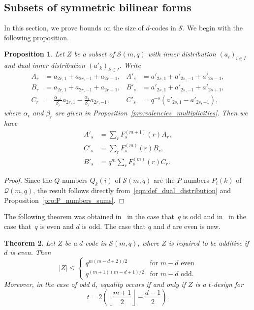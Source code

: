 \documentclass[10pt]{article}
\newtheorem{theorem}{Theorem}[section]
\newtheorem{prop}[theorem]{Proposition}
\theoremstyle{definition}
\newcommand{\Q}{\mathscr{Q}}
\renewcommand{\S}{\mathscr{S}}
\newcommand{\e}{\epsilon}
\newcommand{\abs}[1]{\lvert#1\rvert}
\begin{document}
%

\subsection{Subsets of symmetric bilinear forms}

In this section, we prove bounds on the size of $d$-codes in $\S$. We begin with the following proposition.
\begin{prop}
\label{pro:inner_dist_S}
Let $Z$ be a subset of $\S(m,q)$ with inner distribution $(a_i)_{i\in I}$ and dual inner distribution $(a'_k)_{k\in I}$. Write 
\begin{align*}
A_r&=a_{2r,1}+a_{2r,-1}+a_{2r-1}, & 
A'_s&=a'_{2s,1}+a'_{2s,-1}+a'_{2s-1},\\
B_r&=a_{2r,1}+a_{2r,-1}+a_{2r+1},&
B'_s&=a'_{2s,1}+a'_{2s,-1}+a'_{2s+1},\\
C_r&=\frac{\alpha_{-1}}{\beta_r}a_{2r,1}-\frac{\alpha_{1}}{\beta_r}a_{2r,-1},&
C'_s&=q^{-s}(a'_{2s,1}-a'_{2s,-1}),
\end{align*}
where $\alpha_\e$ and $\beta_r$ are given in Proposition~\ref{pro:valencies_multiplicities}. Then we have
\begin{align*}
A'_s&=\sum_rF^{(m+1)}_s(r)A_r,\\
C'_s&=\sum_rF^{(m)}_s(r)B_r,\\
B'_s&=q^m\sum_rF^{(m)}_s(r)C_r.
\end{align*}
\end{prop}
\begin{proof}
Since the $Q$-numbers $Q_k(i)$ of $\S(m,q)$ are the $P$-numbers $P_i(k)$ of $\Q(m,q)$, the result follows directly from~\eqref{eqn:def_dual_distribution} and Proposition~\ref{pro:P_numbers_sums}.
\end{proof}
\par
The following theorem was obtained in~\cite{Sch2015} in the case that~$q$ is odd and in~\cite{Sch2010} in the case that~$q$ is even and $d$ is odd. The case that $q$ and $d$ are even is new.
\begin{theorem}
\label{thm:bounds_S}
Let $Z$ be a $d$-code in $\S(m,q)$, where $Z$ is required to be additive if $d$ is even. Then
\[
\abs{Z}\le\begin{cases}
q^{m(m-d+2)/2} & \text{for $m-d$ even}\\
q^{(m+1)(m-d+1)/2} & \text{for $m-d$ odd}.
\end{cases}
\]
Moreover, in the case of odd $d$, equality occurs if and only if $Z$ is a $t$-design for
\[
t=2\left(\left\lfloor\frac{m+1}{2}\right\rfloor-\frac{d-1}{2}\right).
\]
\end{theorem}
\end{document}
